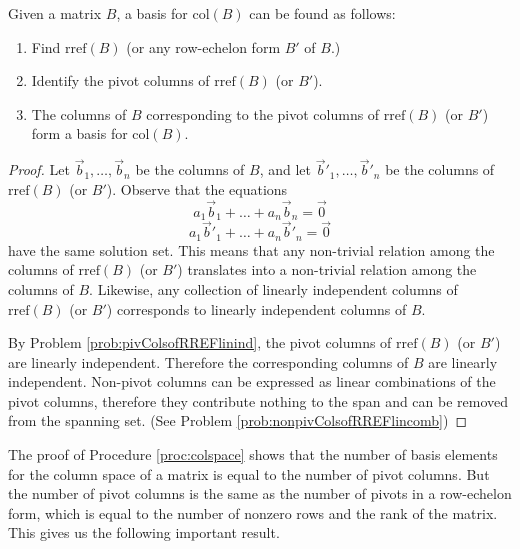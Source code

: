 \documentclass{ximera}
\begin{document}
\begin{procedure}\label{proc:colspace}
Given a matrix $B$, a basis for $\mbox{col}(B)$ can be found as follows:
\begin{enumerate}
\item Find $\mbox{rref}(B)$ (or any row-echelon form $B'$ of $B$.)
\item Identify the pivot columns of $\mbox{rref}(B)$ (or $B'$).
\item The columns of $B$ corresponding to the pivot columns of $\mbox{rref}(B)$ (or $B'$) form a basis for $\mbox{col}(B)$.
\end{enumerate}
\end{procedure}
\begin{proof}  Let $\vec{b}_1,\ldots ,\vec{b}_n$ be the columns of $B$, and let $\vec{b}'_1,\ldots ,\vec{b}'_n$ be the columns of $\mbox{rref}(B)$ (or $B'$).
Observe that the equations
\begin{equation}a_1\vec{b}_1+\ldots +a_n\vec{b}_n=\vec{0}\end{equation}
\begin{equation}a_1\vec{b}'_1+\ldots +a_n\vec{b}'_n=\vec{0}\end{equation}
have the same solution set.  This means that any non-trivial relation among the columns of $\mbox{rref}(B)$ (or $B'$) translates into a non-trivial relation among the columns of $B$.  Likewise, any collection of linearly independent columns of $\mbox{rref}(B)$ (or $B'$) corresponds to linearly independent columns of $B$.

By Problem \ref{prob:pivColsofRREFlinind}, the pivot columns of $\mbox{rref}(B)$ (or $B'$) are linearly independent.  Therefore the corresponding columns of $B$ are linearly independent.  Non-pivot columns can be expressed as linear combinations of the pivot columns, therefore they contribute nothing to the span and can be removed from the spanning set. (See Problem \ref{prob:nonpivColsofRREFlincomb})
\end{proof}
The proof of Procedure \ref{proc:colspace} shows that the number of basis elements for the column space of a matrix is equal to the number of pivot columns.  But the number of pivot columns is the same as the number of pivots in a row-echelon form, which is equal to the number of nonzero rows and the rank of the matrix.  This gives us the following important result.
\end{document}
